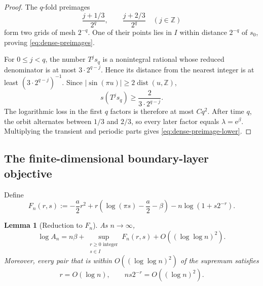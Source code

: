 \documentclass[11pt,oneside]{article}
\numberwithin{equation}{section}
\newtheorem{lemma}[theorem]{Lemma}
\theoremstyle{definition}
\theoremstyle{remark}
\newcommand{\Z}{\mathbb Z}
\newcommand{\e}{\mathrm e}
\newcommand{\defeq}{\mathrel{:=}}
\begin{document}
\begin{proof}
The \(q\)-fold preimages
\[
 \frac{j+1/3}{2^q},\qquad \frac{j+2/3}{2^q}
 \quad(j\in\Z)
\]
form two grids of mesh \(2^{-q}\).  One of their points lies in \(I\) within distance
\(2^{-q}\) of \(s_0\), proving \eqref{eq:dense-preimages}.

For \(0\le j<q\), the number \(T^js_q\) is a nonintegral rational whose reduced
denominator is at most \(3\cdot2^{q-j}\).  Hence its distance from the nearest integer is at
least \((3\cdot2^{q-j})^{-1}\).  Since
\(|\sin(\pi u)|\ge2\operatorname{dist}(u,\Z)\),
\[
 s(T^js_q)\ge\frac{2}{3\cdot2^{q-j}}.
\]
The logarithmic loss in the first \(q\) factors is therefore at most \(Cq^2\).  After time
\(q\), the orbit alternates between \(1/3\) and \(2/3\), so every later factor equals
\(\lambda=\e^\beta\).  Multiplying the transient and periodic parts gives
\eqref{eq:dense-preimage-lower}.
\end{proof}

\subsection{The finite-dimensional boundary-layer objective}

Define
\begin{equation}
 F_n(r,s)
 \defeq-\frac a2r^2
 +r\left(\log(\pi s)-\frac a2-\beta\right)
 -n\log(1+s2^{-r}).
 \label{eq:Fn}
\end{equation}

\begin{lemma}[Reduction to \(F_n\)]
\label{lem:An-reduction}
As \(n\to\infty\),
\begin{equation}
 \log A_n
 =n\beta+
 \sup_{\substack{r\ge0\text{ integer}\\s\in I}}F_n(r,s)
 +O((\log\log n)^2).
 \label{eq:An-reduction}
\end{equation}
Moreover, every pair that is within \(O((\log\log n)^2)\) of the supremum satisfies
\begin{equation}
 r=O(\log n),
 \qquad ns2^{-r}=O((\log n)^2).
 \label{eq:boundary-localization}
\end{equation}
\end{lemma}
\end{document}
